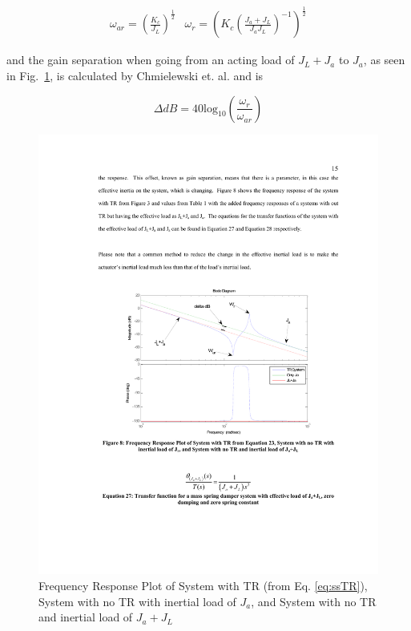 \begin{equation}\label{eq:res}
\begin{array}{cc}

\omega_{ar} = \left(\frac{K_c}{J_L}\right)^\frac{1}{2}

&

\omega_{r} = \left(K_c\left(\frac{J_a+J_L}{J_aJ_L}\right)^{-1}\right)^\frac{1}{2}
\end{array}
\end{equation}

\noindent and the gain separation when going from an acting load of $J_L+J_a$ to $J_a$, as seen in Fig.~\ref{fig:trBode}, is calculated by Chmielewski et. al.\cite{chmielewski} and is

\begin{equation}\label{eq:deltaDB}
\Delta dB = 40\mbox{log}_{10}\left(\frac{\omega_r}{\omega_{ar}}\right)
\end{equation}


\begin{figure}[ht]
  \centering
\includegraphics[width=1.0\columnwidth]{./pix/bode.pdf}
  \caption{Frequency Response Plot of System with TR (from Eq. \ref{eq:ssTR}), System with no TR with
inertial load of $J_a$, and System with no TR and inertial load of $J_a+J_L$}
  \label{fig:trBode}
\end{figure}

